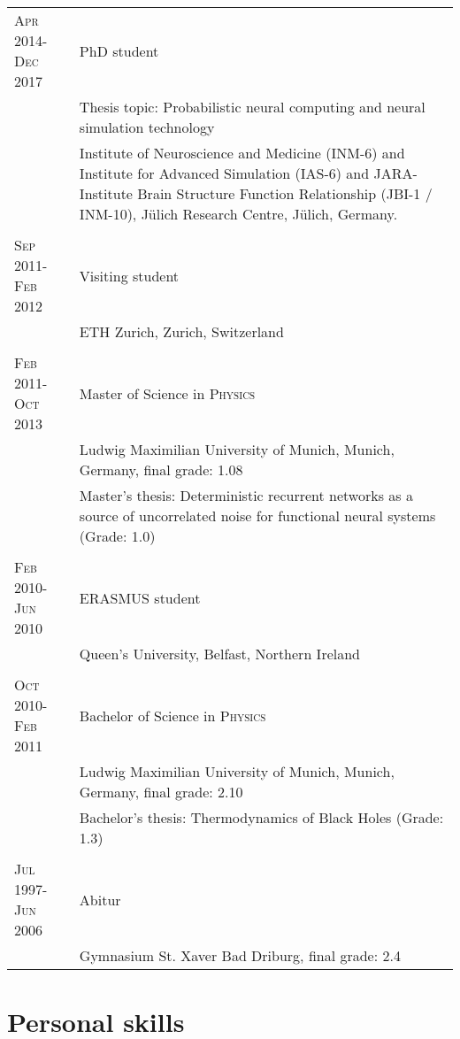 \documentclass[a4paper,10pt]{article}
\begin{document}
\begin{longtable}{>{\hfill}p{3.15cm}|p{10.4cm}}
  \textsc{Apr} 2014-\textsc{Dec} 2017 & PhD student \\
  & \footnotesize Thesis topic: Probabilistic neural computing and neural simulation technology \\
  & \footnotesize Institute of Neuroscience and Medicine (INM-6) and Institute for Advanced Simulation (IAS-6) and JARA-Institute Brain Structure Function Relationship (\mbox{JBI-1} / INM-10), J\"ulich Research Centre, J\"ulich, Germany. \\
  \multicolumn{2}{c}{} \\
  \textsc{Sep} 2011-\textsc{Feb} 2012 & Visiting student \\
  & \footnotesize{ETH Zurich, Zurich, Switzerland} \\
  \multicolumn{2}{c}{} \\
  \textsc{Feb} 2011-\textsc{Oct} 2013 & Master of Science in \textsc{Physics} \\
  & \footnotesize Ludwig Maximilian University of Munich, Munich, Germany, final grade: 1.08 \\
  & \footnotesize Master's thesis: Deterministic recurrent networks as
  a source of uncorrelated noise for
  functional neural systems (Grade: 1.0) \\
  \multicolumn{2}{c}{} \\
  \textsc{Feb} 2010-\textsc{Jun} 2010 & ERASMUS student \\
  & \footnotesize Queen's University, Belfast, Northern Ireland \\
  \multicolumn{2}{c}{} \\
  \textsc{Oct} 2010-\textsc{Feb} 2011 & Bachelor of Science in \textsc{Physics} \\
  & \footnotesize Ludwig Maximilian University of Munich, Munich, Germany, final grade: 2.10 \\
  & \footnotesize Bachelor's thesis: Thermodynamics of Black Holes (Grade: 1.3) \\
  \multicolumn{2}{c}{} \\
  \textsc{Jul} 1997-\textsc{Jun} 2006 & Abitur \\
  & \footnotesize Gymnasium St. Xaver Bad Driburg, final grade: 2.4
\end{longtable}

\section{Personal skills}
\end{document}
